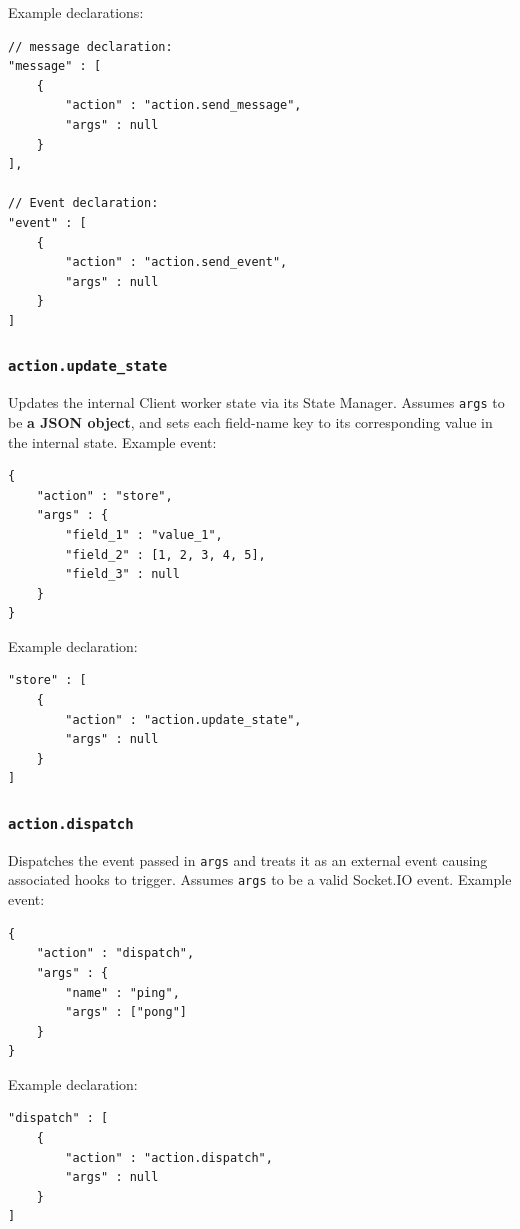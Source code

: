\documentclass[a4paper]{article}
\begin{document}
\noindent
Example declarations:

\begin{verbatim}
// message declaration:
"message" : [
    {
        "action" : "action.send_message",
        "args" : null
    }
],

// Event declaration:
"event" : [
    {
        "action" : "action.send_event",
        "args" : null
    }
]
\end{verbatim}
\subsubsection{\texttt{action.update\_state}}
\label{sec-9-3-4}

Updates the internal Client worker state via its State Manager. Assumes \texttt{args} to be \textbf{a JSON object}, and sets each field-name key to its corresponding value in the internal state. Example event:

\begin{verbatim}
{
    "action" : "store",
    "args" : {
        "field_1" : "value_1",
        "field_2" : [1, 2, 3, 4, 5],
        "field_3" : null
    }
}
\end{verbatim}




\noindent
Example declaration:

\begin{verbatim}
"store" : [
    {
        "action" : "action.update_state",
        "args" : null
    }
]
\end{verbatim}
\subsubsection{\texttt{action.dispatch}}
\label{sec-9-3-5}

Dispatches the event passed in \texttt{args} and treats it as an external event causing associated hooks to trigger. Assumes \texttt{args} to be a valid Socket.IO event. Example event:

\begin{verbatim}
{
    "action" : "dispatch",
    "args" : {
        "name" : "ping",
        "args" : ["pong"]
    }
}
\end{verbatim}




\noindent
Example declaration:

\begin{verbatim}
"dispatch" : [
    {
        "action" : "action.dispatch",
        "args" : null
    }
]
\end{verbatim}
\end{document}
